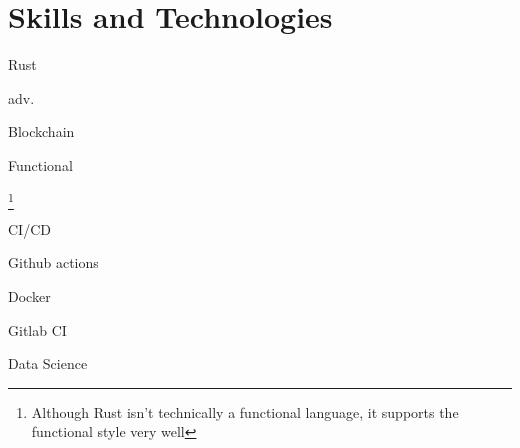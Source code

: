 \documentclass{CurriculumVitae}[10pt, condensed]
\begin{document}
\vfill
\vfill
\section*{Skills and Technologies}
\setlength{\parindent}{0in}%

\begin{multicols}{4}

    \begin{skills}{Rust}
    \item adv.~
    \item {}
    \item {}
    \item {}
    \item {}
    \end{skills}

    \begin{skills}{Blockchain}
    \item {}
    \item {}
    \item {}
    \item {}
    \end{skills}

    \begin{skills}{Functional}
    \item {}
    \item {}\footnote{Although Rust isn't technically a functional language, it supports the functional style very well}
    \item {}
    \item {}
    \end{skills}

    \begin{skills}{CI/CD}
    \item Github actions
    \item Docker
    \item {}
    \item {}
    \item Gitlab CI
    \end{skills}


    \begin{skills}{Data Science}
    \item {}
    \item {}
    \item {}
    \item {}
    \end{skills}


\end{multicols}
\end{document}
